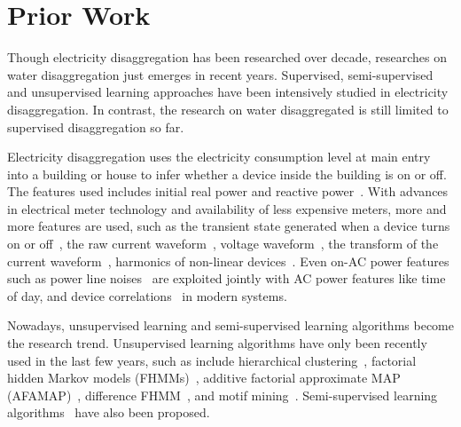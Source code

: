 \section{Prior Work}
Though electricity disaggregation has been researched over decade, 
researches on water disaggregation just emerges in recent years. 
Supervised, semi-supervised and unsupervised learning approaches have been intensively
studied in electricity disaggregation. In contrast, the research on water disaggregated 
is still limited to supervised disaggregation so far. 

Electricity disaggregation uses the electricity consumption level at main entry into a building or house 
to infer whether a device inside the building is on or off. 
The features used includes initial real power and reactive power~\cite{hart1992}. 
With advances in electrical meter technology and availability of less expensive meters, 
more and more features are used, such as 
the transient state generated when a device turns on or off~\cite{shaw2000PhdThesis},
the raw current waveform~\cite{srinivasan2006neural}, voltage waveform~\cite{lam2007novel}, 
the transform of the current waveform~\cite{chan2000harmonics}, 
harmonics of non-linear devices~\cite{chan2000harmonics}. 
Even on-AC power features such as power line noises~\cite{patel2007flick}
are exploited jointly with AC power features like  
time of day, and device correlations~\cite{kim2011unsupervised}
in modern systems. 

Nowadays, 
unsupervised learning and semi-supervised learning algorithms 
become the research trend.
Unsupervised learning algorithms
have only been recently used in
 the last few years, such as include
hierarchical clustering~\cite{gonccalves2011unsupervised},
factorial hidden Markov models (FHMMs)~\cite{kim2011unsupervised},
additive factorial approximate MAP (AFAMAP)~\cite{kolter2012aistat}, 
difference FHMM~\cite{parson2012nonintrusive}, 
and motif mining~\cite{shao2013temporal}.
Semi-supervised learning 
algorithms~\cite{lam2007novel,johnson2012bayesian} have also
been proposed.

